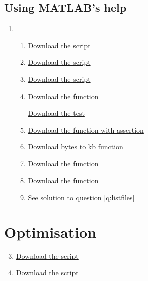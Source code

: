 \documentclass{article}
\begin{document}
	\subsection*{Using MATLAB's help}
	\begin{enumerate}[resume]
		\item 
		\begin{enumerate} 
			\item \href{https://github.com/UoMResearchIT/MATLAB-online-exercises/raw/master/lesson6_mfiles/q3a.m}{Download the script}
			
			\item \href{https://github.com/UoMResearchIT/MATLAB-online-exercises/raw/master/lesson6_mfiles/q3b.m}{Download the script}
			
			\item \href{https://github.com/UoMResearchIT/MATLAB-online-exercises/raw/master/lesson6_mfiles/q3c.m}{Download the script}
						
			\item \href{https://github.com/UoMResearchIT/MATLAB-online-exercises/raw/master/lesson6_mfiles/q3d.m}{Download the function}
			
			 \href{https://github.com/UoMResearchIT/MATLAB-online-exercises/raw/master/lesson6_mfiles/q3d_test.m}{Download the test}
			
			\item \href{https://github.com/UoMResearchIT/MATLAB-online-exercises/raw/master/lesson6_mfiles/q3e.m}{Download the function with assertion}
			
			
			
			\item \href{https://github.com/UoMResearchIT/MATLAB-online-exercises/raw/master/lesson6_mfiles/btokb.m}{Download bytes to kb function}
			
			\item \href{https://github.com/UoMResearchIT/MATLAB-online-exercises/raw/master/lesson6_mfiles/q3g.m}{Download the function}
			
			\item \href{https://github.com/UoMResearchIT/MATLAB-online-exercises/raw/master/lesson6_mfiles/listfiles.m}{Download the function}
			\label{q:listfiles}
			
			\item See solution to question \ref{q:listfiles}
		\end{enumerate}
	\end{enumerate}
	\section{Optimisation}
	\begin{enumerate}
		\setcounter{enumi}{2}
		\item \href{https://github.com/UoMResearchIT/MATLAB-online-exercises/raw/master/lesson6_mfiles/loopy_editor_suggestions.m}{Download the script}	
		\item \href{https://github.com/UoMResearchIT/MATLAB-online-exercises/raw/master/lesson6_mfiles/fast_loopy.m}{Download the script}	
	\end{enumerate}

				
\end{document}
